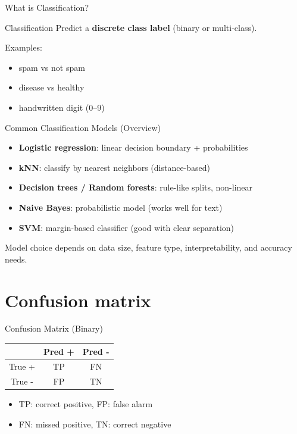 \documentclass[aspectratio=169]{beamer}
\begin{document}
\begin{frame}{What is Classification?}
  \begin{block}{Classification}
    Predict a \textbf{discrete class label} (binary or multi-class).
  \end{block}
  Examples:
  \begin{itemize}[<+->]
    \item spam vs not spam
    \item disease vs healthy
    \item handwritten digit (0--9)
  \end{itemize}
\end{frame}

\begin{frame}{Common Classification Models (Overview)}
  \begin{itemize}[<+->]
    \item \textbf{Logistic regression}: linear decision boundary + probabilities
    \item \textbf{kNN}: classify by nearest neighbors (distance-based)
    \item \textbf{Decision trees / Random forests}: rule-like splits, non-linear
    \item \textbf{Naive Bayes}: probabilistic model (works well for text)
    \item \textbf{SVM}: margin-based classifier (good with clear separation)
  \end{itemize}
  \vspace{0.3em}
  \small Model choice depends on data size, feature type, interpretability, and accuracy needs.
\end{frame}

\section{Confusion matrix}
\label{sec:cm}

\begin{frame}{Confusion Matrix (Binary)}
  \centering
  \begin{tabular}{c|cc}
    & Pred + & Pred - \\\hline
    True + & TP & FN \\
    True - & FP & TN \\
  \end{tabular}
  \vspace{0.4em}
  \begin{itemize}
    \item TP: correct positive, FP: false alarm
    \item FN: missed positive, TN: correct negative
  \end{itemize}
\end{frame}
\end{document}
